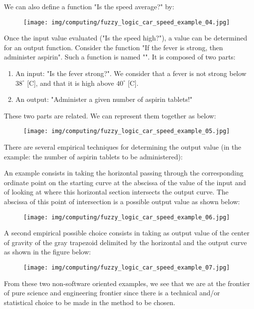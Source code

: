 	We can also define a function "Is the speed average?" by:
	\begin{figure}[H]
		\centering
		\texttt{[image: img/computing/fuzzy\_logic\_car\_speed\_example\_04.jpg]}
	\end{figure}
	Once the input value evaluated ("Is the speed high?"), a value can be determined for an output function. Consider the function "If the fever is strong, then administer aspirin". Such a function is named "". It is composed of two parts:
	\begin{enumerate}
		\item An input: "Is the fever strong?". We consider that a fever is not strong below $38^\circ$ [C], and that it is high above $40^\circ$ [C].
		
		\item An output: "Administer a given number of aspirin tablets!"
	\end{enumerate}
	These two parts are related. We can represent them together as below:
	\begin{figure}[H]
		\centering
		\texttt{[image: img/computing/fuzzy\_logic\_car\_speed\_example\_05.jpg]}
	\end{figure}
	There are several empirical techniques for determining the output value (in the example: the number of aspirin tablets to be administered):

	An example consists in taking the horizontal passing through the corresponding ordinate point on the starting curve at the abscissa of the value of the input and of looking at where this horizontal section intersects the output curve. The abscissa of this point of intersection is a possible output value as shown below:
	\begin{figure}[H]
		\centering
		\texttt{[image: img/computing/fuzzy\_logic\_car\_speed\_example\_06.jpg]}
	\end{figure}
	A second empirical possible choice consists in taking as output value of the center of gravity of the gray trapezoid delimited by the horizontal and the output curve as shown in the figure below:
	\begin{figure}[H]
		\centering
		\texttt{[image: img/computing/fuzzy\_logic\_car\_speed\_example\_07.jpg]}
	\end{figure}
	From these two non-software oriented examples, we see that we are at the frontier of pure science and engineering frontier since there is a technical and/or statistical choice to be made in the method to be chosen.
	
